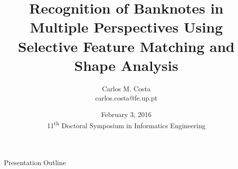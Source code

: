 





\title{Recognition of Banknotes in Multiple Perspectives Using Selective Feature Matching and Shape Analysis}
\author{Carlos M. Costa\texorpdfstring{\\{\ttfamily carlos.costa@fe.up.pt}}{}}
\date{February 3, 2016\\{\small 11\textsuperscript{th} Doctoral Symposium in Informatics Engineering}}



\begin{frame}
	\titlepage
\end{frame}




\begin{frame}{Presentation Outline}
	\tableofcontents
\end{frame}













